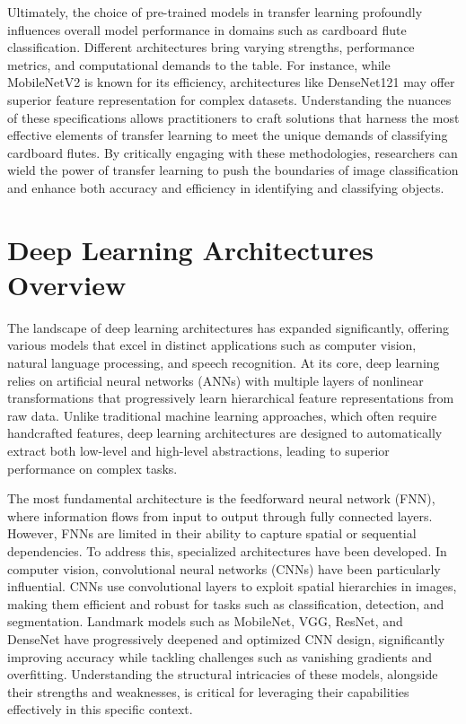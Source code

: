 Ultimately, the choice of pre-trained models in transfer learning profoundly influences overall model performance in domains such as cardboard flute classification. Different architectures bring varying strengths, performance metrics, and computational demands to the table. For instance, while MobileNetV2 is known for its efficiency, architectures like DenseNet121 may offer superior feature representation for complex datasets. Understanding the nuances of these specifications allows practitioners to craft solutions that harness the most effective elements of transfer learning to meet the unique demands of classifying cardboard flutes. By critically engaging with these methodologies, researchers can wield the power of transfer learning to push the boundaries of image classification and enhance both accuracy and efficiency in identifying and classifying objects.



\section{Deep Learning Architectures Overview}

The landscape of deep learning architectures has expanded significantly, offering various models that excel in distinct applications such as computer vision, natural language processing, and speech recognition. At its core, deep learning relies on artificial neural networks (ANNs) with multiple layers of nonlinear transformations that progressively learn hierarchical feature representations from raw data. Unlike traditional machine learning approaches, which often require handcrafted features, deep learning architectures are designed to automatically extract both low-level and high-level abstractions, leading to superior performance on complex tasks.


The most fundamental architecture is the feedforward neural network (FNN), where information flows from input to output through fully connected layers. However, FNNs are limited in their ability to capture spatial or sequential dependencies. To address this, specialized architectures have been developed. In computer vision, convolutional neural networks (CNNs) have been particularly influential. CNNs use convolutional layers to exploit spatial hierarchies in images, making them efficient and robust for tasks such as classification, detection, and segmentation. Landmark models such as MobileNet, VGG, ResNet, and DenseNet have progressively deepened and optimized CNN design, significantly improving accuracy while tackling challenges such as vanishing gradients and overfitting. Understanding the structural intricacies of these models, alongside their strengths and weaknesses, is critical for leveraging their capabilities effectively in this specific context.



